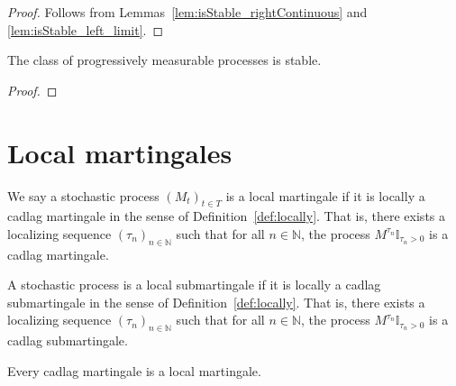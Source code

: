 \begin{proof}
  \leanok
  Follows from Lemmas~\ref{lem:isStable_rightContinuous} and \ref{lem:isStable_left_limit}.
\end{proof}


\begin{lemma}\label{lem:isStable_isStronglyProgressive}
  \leanok
The class of progressively measurable processes is stable.
\end{lemma}

\begin{proof}\leanok
\end{proof}





\section{Local martingales}

\begin{definition}\label{def:IsLocalMartingale}
  \leanok
  We say a stochastic process $(M_t)_{t \in T}$ is a local martingale if it is locally a cadlag martingale in the sense of
  Definition~\ref{def:locally}. That is, there exists a localizing sequence $(\tau_n)_{n \in \mathbb{N}}$ such that for all $n \in \mathbb{N}$, the process $M^{\tau_n}\mathbb{I}_{\tau_n > 0}$ is a cadlag martingale.
\end{definition}


\begin{definition}\label{def:IsLocalSubmartingale}
  \leanok
A stochastic process is a local submartingale if it is locally a cadlag submartingale in the sense of Definition~\ref{def:locally}.
That is, there exists a localizing sequence $(\tau_n)_{n \in \mathbb{N}}$ such that for all $n \in \mathbb{N}$, the process $M^{\tau_n}\mathbb{I}_{\tau_n > 0}$ is a cadlag submartingale.
\end{definition}


\begin{lemma}\label{lem:Martingale.IsLocalMartingale}
  \leanok
Every cadlag martingale is a local martingale.
\end{lemma}

